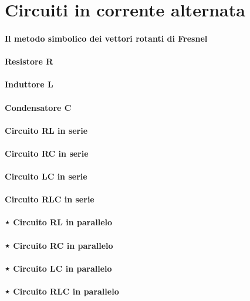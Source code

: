 \section{Circuiti in corrente alternata}
\paragraph{Il metodo simbolico dei vettori rotanti di Fresnel}
\paragraph{Resistore R}
\paragraph{Induttore L}
\paragraph{Condensatore C}
\paragraph{Circuito RL in serie}
\paragraph{Circuito RC in serie}
\paragraph{Circuito LC in serie}
\paragraph{Circuito RLC in serie}
\paragraph{⋆ Circuito RL in parallelo}
\paragraph{⋆ Circuito RC in parallelo}
\paragraph{⋆ Circuito LC in parallelo}
\paragraph{⋆ Circuito RLC in parallelo}